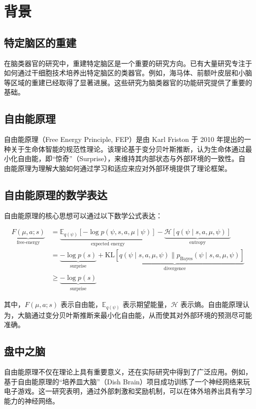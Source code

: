 \chapter{背景}\label{chap:background}

\section{特定脑区的重建}\label{sec:brain-region-reconstruction}
在脑类器官的研究中，重建特定脑区是一个重要的研究方向\cite{Kim2023}。已有大量研究专注于如何通过干细胞技术培养出特定脑区的类器官。例如，海马体、前额叶皮层和小脑等区域的重建已经取得了显著进展。这些研究为脑类器官的功能研究提供了重要的基础。

\section{自由能原理}\label{sec:free-energy-principle}
自由能原理（Free Energy Principle, FEP）是由 Karl Friston 于 2010 年提出的一种关于生命体智能的规范性理论\cite{Friston2010}。该理论基于变分贝叶斯推断，认为生命体通过最小化自由能，即“惊奇”（Surprise），来维持其内部状态与外部环境的一致性。自由能原理为理解大脑如何通过学习和适应来应对外部环境提供了理论框架。

\section{自由能原理的数学表达}\label{sec:free-energy-math}
自由能原理的核心思想可以通过以下数学公式表达：

\[
    \begin{aligned}
        \underbrace{F(\mu, a; s)}_{\text{free-energy}} & = \underbrace{\mathbb{E}_{q(\psi)} \left[ -\log p(\psi, s, a, \mu \mid \psi) \right]}_{\text{expected energy}} - \underbrace{\mathcal{H}[q(\psi \mid s, a, \mu, \psi)]}_{\text{entropy}} \\
                                                       & = \underbrace{-\log p(s)}_{\text{surprise}} + \underbrace{\text{KL}[q(\psi \mid s, a, \mu, \psi) \parallel p_{\text{Bayes}}(\psi \mid s, a, \mu, \psi)]}_{\text{divergence}}             \\
                                                       & \geq \underbrace{-\log p(s)}_{\text{surprise}}
    \end{aligned}
\]

其中，$F(\mu, a; s)$ 表示自由能，$\mathbb{E}_{q(\psi)}$ 表示期望能量，$\mathcal{H}$ 表示熵。自由能原理认为，大脑通过变分贝叶斯推断来最小化自由能，从而使其对外部环境的预测尽可能准确。

\section{盘中之脑}\label{sec:dish-brain}
自由能原理不仅在理论上具有重要意义，还在实际研究中得到了广泛应用。例如，基于自由能原理的“培养皿大脑”（Dish Brain）项目成功训练了一个神经网络来玩电子游戏\cite{Kagan2022}。这一研究表明，通过外部刺激和奖励机制，可以在体外培养出具有学习能力的神经网络。

